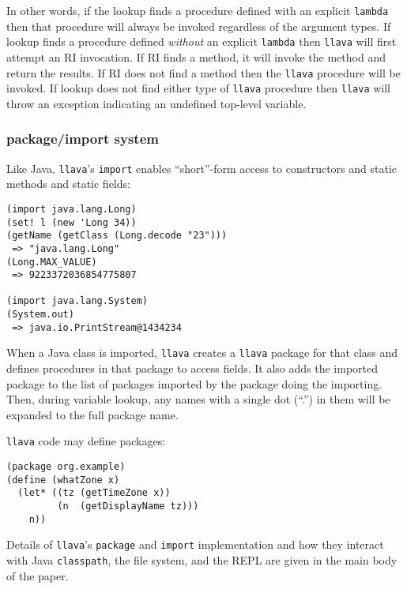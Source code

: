 \documentclass[final]{ieee}
\begin{document}
In other words, if the lookup finds a procedure defined with an
explicit {\tt lambda} then that procedure will always be invoked
regardless of the argument types.  If lookup finds a procedure defined
\emph{without} an explicit {\tt lambda} then {\tt llava} will first
attempt an RI invocation.  If RI finds a method, it will invoke the
method and return the results.  If RI does not find a method then the
{\tt llava} procedure will be invoked.  If lookup does not find either
type of {\tt llava} procedure then {\tt llava} will throw an exception
indicating an undefined top-level variable.

\subsubsection{package/import system}

Like Java, {\tt llava}'s {\tt import} enables ``short''-form access to
constructors and static methods and static fields:

\small
\begin{verbatim}
(import java.lang.Long)
(set! l (new 'Long 34))
(getName (getClass (Long.decode "23")))
 => "java.lang.Long"
(Long.MAX_VALUE)
 => 9223372036854775807

(import java.lang.System)
(System.out)
 => java.io.PrintStream@1434234
\end{verbatim}
\normalsize

When a Java class is imported, {\tt llava} creates a {\tt llava}
package for that class and defines procedures in that package to
access fields.  It also adds the imported package to the list of
packages imported by the package doing the importing.  Then, during
variable lookup, any names with a single dot (``.'') in them will be
expanded to the full package name.


{\tt llava} code may define packages:

\small
\begin{verbatim}
(package org.example)
(define (whatZone x)
  (let* ((tz (getTimeZone x))
         (n  (getDisplayName tz)))
    n))
\end{verbatim}
\normalsize


Details of {\tt llava}'s {\tt package} and {\tt import} implementation
and how they interact with Java {\tt classpath}, the file system, and
the REPL are given in the main body of the paper.
\end{document}
